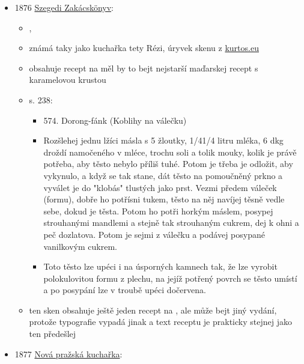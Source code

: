 \begin{itemize}
  \begin{itemize}
  \tightlist
  \item
    Schovanka, původní román A. H. Sokola
  \item
    doktor je na návštěvě u svojí přítelkyně Amálky, její teta ho zve na
    trdelník, zvláštní jídlo z mouky, jen jedna z tisíce kuchařek ho umí
    dělati
  \end{itemize}
\item
  1876
  \href{https://web.archive.org/web/20200408215210/http://kurtos.eu/dl/ReziNeni.pdf}{Szegedi
  Zakácskönyv}:

  \begin{itemize}
  \tightlist
  \item
     , 
  \item
    známá taky jako kuchařka tety Rézi, úryvek skenu z
    \href{https://web.archive.org/web/20201229075220/http://www.kurtos.eu/documentation}{kurtos.eu}
  \item
    obsahuje recept na  měl by to bejt nejstarší
    maďarskej recept s karamelovou krustou
  \item
    s. 238:

    \begin{itemize}
    \tightlist
    \item
      574. Dorong-fánk (Koblihy na válečku)
    \item
      Rozšlehej jednu lžíci másla s 5 žloutky, 1/41/4 litru mléka, 6 dkg
      droždí namočeného v mléce, trochu soli a tolik mouky, kolik je
      právě potřeba, aby těsto nebylo příliš tuhé. Potom je třeba je
      odložit, aby vykynulo, a když se tak stane, dát těsto na
      pomoučněný prkno a vyválet je do "klobás" tlustých jako prst.
      Vezmi předem váleček (formu), dobře ho potřísni tukem, těsto na
      něj navíjej těsně vedle sebe, dokud je těsta. Potom ho potři
      horkým máslem, posypej strouhanými mandlemi a stejně tak
      strouhaným cukrem, dej k ohni a peč dozlatova. Potom je sejmi z
      válečku a podávej posypané vanilkovým cukrem.
    \item
      Toto těsto lze upéci i na úsporných kamnech tak, že lze vyrobit
      polokulovitou formu z plechu, na jejíž potřený povrch se těsto
      umístí a po posypání lze v troubě upéci dočervena.
    \end{itemize}
  \item
    ten sken obsahuje ještě jeden recept na  , ale
    může bejt jiný vydání, protože typografie vypadá jinak a text
    receptu je prakticky stejnej jako ten předešlej
  \end{itemize}
\item
  1877
  \href{https://ndk.cz/uuid/uuid:4a4d0090-c5f6-11dd-9384-000d606f5dc6}{Nová
  pražská kuchařka}:


\end{itemize}
